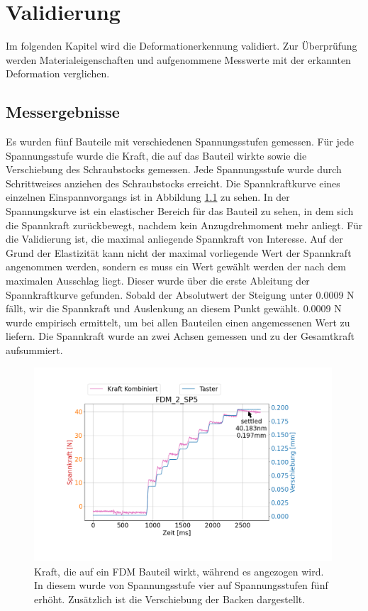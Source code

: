 
\chapter{Validierung}

Im folgenden Kapitel wird die Deformationerkennung validiert.
Zur Überprüfung werden Materialeigenschaften und aufgenommene Messwerte 
mit der erkannten Deformation verglichen.

\section{Messergebnisse} \label{validation}

Es wurden fünf Bauteile mit verschiedenen Spannungsstufen gemessen. Für jede 
Spannungsstufe wurde die Kraft, die auf das Bauteil wirkte sowie die Verschiebung 
des Schraubstocks gemessen.
Jede Spannungsstufe wurde durch Schrittweises anziehen des Schraubstocks erreicht.
Die Spannkraftkurve eines einzelnen Einspannvorgangs ist in 
Abbildung \ref{fig:single} zu sehen. 
In der Spannungskurve ist ein elastischer Bereich für das 
Bauteil zu sehen, in dem sich die Spannkraft zurückbewegt, nachdem kein 
Anzugdrehmoment mehr anliegt. Für die Validierung ist, die maximal anliegende 
Spannkraft von Interesse. Auf der Grund der Elastizität kann nicht der maximal vorliegende 
Wert der Spannkraft angenommen werden, 
sondern es muss ein Wert gewählt werden der nach dem maximalen Ausschlag liegt.
Dieser wurde über die erste Ableitung der Spannkraftkurve gefunden. Sobald der 
Absolutwert der Steigung unter 0.0009 N fällt, wir die Spannkraft und Auslenkung an 
diesem Punkt gewählt. 0.0009 N wurde empirisch ermittelt, um bei allen Bauteilen einen 
angemessenen Wert zu liefern.
Die Spannkraft wurde an zwei Achsen gemessen und zu der Gesamtkraft aufsummiert.

\begin{figure}[H]
    \centering
    \includegraphics[width=0.99\textwidth]{images/spannkraftstufen_single.png}
    \caption{Kraft, die auf ein FDM Bauteil wirkt, während es angezogen wird. In diesem 
    wurde von Spannungsstufe vier auf Spannungsstufen fünf erhöht. Zusätzlich ist 
    die Verschiebung der Backen dargestellt.}
    \label{fig:single}
\end{figure}

